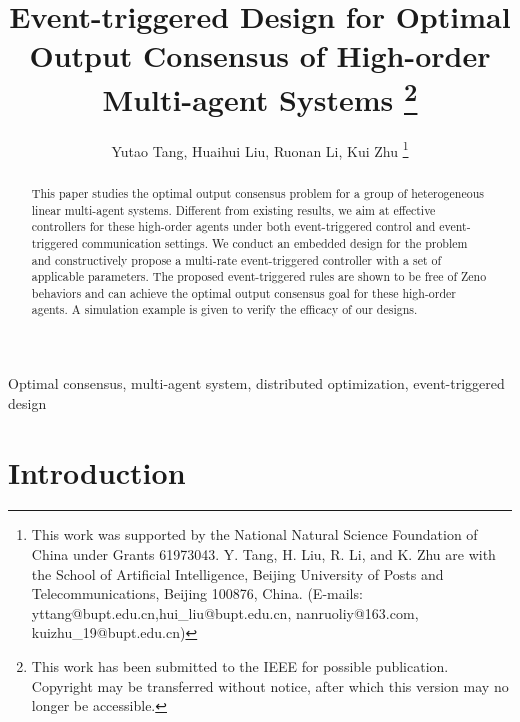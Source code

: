 \documentclass[sort&compress]{IEEEtran}
\begin{document}
\title{Event-triggered Design for Optimal Output Consensus of High-order Multi-agent Systems %
	\thanks{This work has been submitted to the IEEE for possible publication. Copyright may be transferred without notice, after which this version may no longer be accessible.}
}
\author{Yutao Tang, Huaihui Liu,  Ruonan Li, Kui Zhu
	\thanks{This work was supported by the National Natural Science Foundation of China under Grants 61973043.  Y. Tang, H. Liu, R. Li, and K. Zhu are with the School of Artificial Intelligence, Beijing University of Posts and Telecommunications, Beijing 100876, China. (E-mails: yttang@bupt.edu.cn,hui\_liu@bupt.edu.cn, nanruoliy@163.com, kuizhu\_19@bupt.edu.cn)}
}	
\date{ }
\maketitle

\begin{abstract}
	This paper studies the optimal output consensus problem for a group of heterogeneous linear multi-agent systems. Different from existing results, we aim at effective controllers for these high-order agents under both event-triggered control and event-triggered communication settings. We conduct an embedded design for the problem and constructively propose a multi-rate event-triggered controller with a set of applicable parameters. The proposed event-triggered rules are shown to be free of Zeno behaviors and can achieve the optimal output consensus goal for these high-order agents. A simulation example is given to verify the efficacy of our designs. 
\end{abstract}
	
\begin{IEEEkeywords}
	Optimal consensus, multi-agent system, distributed optimization, event-triggered design
\end{IEEEkeywords}

\IEEEpeerreviewmaketitle

\section{Introduction}
\end{document}
